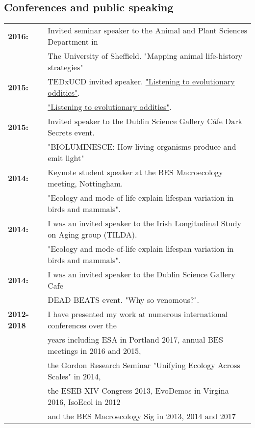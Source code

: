 \documentclass[10pt,a4paper]{article}
\begin{document}
\begin{flushleft}
\bigskip




\section{\textbf{Conferences and public speaking}}
\begin{tabular}{ll}
\textbf{2016:} & Invited seminar speaker to the Animal and Plant Sciences Department in\\
& The University of Sheffield. "Mapping animal life-history strategies"\\
\textbf{2015:} & TEDxUCD invited speaker. \href{https://www.youtube.com/watch?v=-CHtfWEKifY}{"Listening to evolutionary oddities"}.\\
& \href{https://www.youtube.com/watch?v=-CHtfWEKifY}{"Listening to evolutionary oddities"}.\\ 
\textbf{2015:} & Invited speaker to the Dublin Science Gallery Cáfe Dark Secrets event.\\ 
& "BIOLUMINESCE: How living organisms produce and emit light"\\ 
\textbf{2014:} & Keynote student speaker at the BES Macroecology meeting, Nottingham.\\ 
&"Ecology and mode-of-life explain lifespan variation in birds and mammals".\\
\textbf{2014:} & I was an invited speaker to the Irish Longitudinal Study on Aging group (TILDA).\\ 
& "Ecology and mode-of-life explain lifespan variation in birds and mammals".\\
\textbf{2014:} & I was an invited speaker to the Dublin Science Gallery Cafe\\ 
& DEAD BEATS event. "Why so venomous?".\\
\textbf{2012-2018} & I have presented my work at numerous international conferences over the\\
& years including ESA in Portland 2017, annual BES meetings in 2016 and 2015,\\
& the Gordon Research Seminar "Unifying Ecology Across Scales" in 2014,\\
& the ESEB XIV Congress 2013, EvoDemos in Virgina 2016, IsoEcol in 2012\\
& and the BES Macroecology Sig in 2013, 2014 and 2017\\
\end{tabular}


\end{flushleft}
\end{document}
